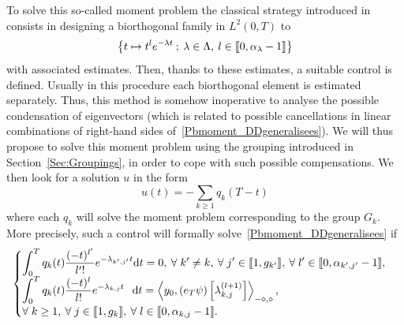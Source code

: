 \documentclass[10pt]{amsart}
\theoremstyle{definition}\newtheorem{defi}[theo]{Definition}\newtheorem{rema}[theo]{Remark}\newtheorem{exam}[theo]{Example}\newtheorem{exem}[theo]{Example}\newtheorem{nota}[theo]{Notation}
\newcommand{\llbracket}{\mathopen{[\mkern -2.7mu[}}
\newcommand{\rrbracket}{\mathclose{]\mkern -2.7mu]}}
\newcommand{\inter}[2]{\llbracket #1,#2 \rrbracket}
\newcommand{\dual}[2]{\left\langle #1, #2 \right\rangle_{-\diamond,\diamond}}
\newcommand{\n}{g}
\newcommand{\md}{\mathrm{d}}
\let\oldforall\forall
\renewcommand*{\forall}{\mathrel{\oldforall}}
\begin{document}
To solve this so-called moment problem the classical strategy introduced in~\cite{FattoriniRussell71} consists in designing a biorthogonal family in $L^2(0,T)$ to
\[
\left\{ t \mapsto t^l e^{-\lambda t} \: ; \: \lambda \in \Lambda, \: l \in \inter{0}{\alpha_\lambda -1} \right\}
\]
with associated estimates. Then, thanks to these estimates, a suitable control is defined. Usually in this procedure each biorthogonal element is estimated separately. Thus, this method is somehow inoperative to analyse the possible condensation of eigenvectors (which is related to possible cancellations in linear combinations of right-hand sides of~\eqref{Pbmoment_DDgeneralisees}). We will thus propose to solve this moment problem using the grouping introduced in Section~\ref{Sec:Groupings}, in order to cope with such possible compensations. We then look for a solution $u$ in the form
\begin{equation}\label{FormeControle}
u(t) = - \sum_{k \geq 1} q_k(T-t)
\end{equation}
where each $q_k$ will solve the moment problem corresponding to the group $G_k$. More precisely, such a control will formally solve~\eqref{Pbmoment_DDgeneralisees} if
\begin{equation}\label{Def:GBF_DD}
\begin{cases}
\displaystyle\int_0^T q_k(t) \frac{(-t)^{l'}}{l'!} e^{-\lambda_{k',j'} t} \md t = 0, \: \forall k' \neq k, \: \forall j'\in \inter{1}{\n_{k'}}, \: \forall l' \in \inter{0}{\alpha_{k',j'}-1},
\\[0.15em]
\displaystyle\int_0^T q_k(t) \frac{(-t)^l}{l!} e^{-\lambda_{k,j} t}\;\;\, \md t = \dual{y_0}{(e_T \psi) \left[\lambda_{k,j}^{(l+1)}\right] },
\\[0.15em]
\displaystyle\forall k \geq 1, \: \forall j \in \inter{1}{\n_k}, \: \forall l \in \inter{0}{\alpha_{k,j}-1}.
\end{cases}
\end{equation}
\end{document}
